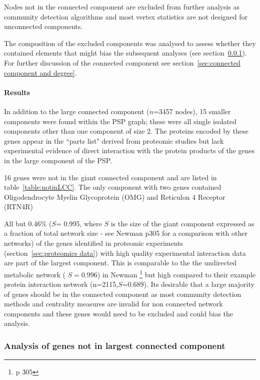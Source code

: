 Nodes not in the connected component are excluded from further analysis as community detection algorithms and most vertex statistics are not designed for unconnected components.

The composition of the excluded components was analysed to assess whether they contained elements that might bias the subsequent analyses (see section~\ref{sec:analysis of genes not in largest component}).%
For further discussion of the  connected component see section~\ref{sec:connected component and degree}. 

\paragraph{Results}
In addition to the large connected component ($n$=3457 nodes), 15 smaller components were found within the PSP graph; these were all single isolated components other than one component of size 2.  The  proteins encoded by these genes appear in the ``parts list" derived from proteomic studies but lack experimental evidence of direct interaction with the protein products of the genes in the large component of the PSP.


16 genes were not in the giant connected component and are listed in table~\ref{table:notinLCC}. The only component with two genes contained Oligodendrocyte Myelin Glycoprotein (OMG) and Reticulon 4 Receptor (RTN4R)%

 

All but 0.46\% ($S$= 0.995, where $S$ is the size of the giant component expressed as a fraction of total network size - see Newman\cite{newman2018networks} p305 for a comparison with other networks) of the genes identified in proteomic experiments (section~\ref{sec:proteomics data}) with high quality experimental interaction data are part of the largest component. This is comparable to the the undirected metabolic network ( $S=0.996$) in Newman \cite{newman2018networks} \footnote{p 305} but high compared to their example protein interaction network (n=2115,$S$=0.689). Its desirable that a large majority of genes should be in the connected component as most community detection methods and centrality measures are invalid for non connected network components and these genes would need to be excluded and could bias the analysis. 
\subsubsection{Analysis of genes not in largest connected component}
\label{sec:analysis of genes not in largest component}

